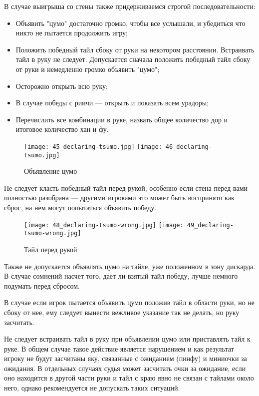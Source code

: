 В случае выигрыша со стены также придерживаемся строгой последовательности:

\begin{itemize}
	\item Объявить "цумо" достаточно громко, чтобы все услышали, и убедиться что никто не пытается продолжить игру;
	\item Положить победный тайл сбоку от руки на некотором расстоянии. Встраивать тайл в руку не следует. Допускается сначала положить победный тайл сбоку от руки и немедленно громко объявить "цумо";
	\item Осторожно открыть всю руку;
	\item В случае победы с риичи --- открыть и показать всем урадоры;
	\item Перечислить все комбинации в руке, назвать общее количество дор и итоговое количество хан и фу.
\end{itemize}

\begin{figure}[H]
	\centering
	\texttt{[image: 45\_declaring-tsumo.jpg]}
	\texttt{[image: 46\_declaring-tsumo.jpg]}
	\caption{Объявление цумо}
\end{figure}

Не следует класть победный тайл перед рукой, особенно если стена перед вами полностью разобрана --- другими игроками это может быть воспринято как сброс, на нем могут попытаться объявить победу.

\begin{figure}[H]
	\centering
	\texttt{[image: 48\_declaring-tsumo-wrong.jpg]}
	\texttt{[image: 49\_declaring-tsumo-wrong.jpg]}
	\caption{Тайл перед рукой}
\end{figure}

Также не допускается объявлять цумо на тайле, уже положенном в зону дискарда. В случае сомнений насчет того, дает ли взятый тайл победу, лучше немного подумать перед сбросом.

В случае если игрок пытается объявить цумо положив тайл в области руки, но не сбоку от нее, ему следует вынести вежливое указание так не делать, но руку засчитать. 

\newpage

Не следует встраивать тайл в руку при объявлении цумо или приставлять тайл к руке. В общем случае такое действие является нарушением и как результат игроку не будут засчитаны яку, связанные с ожиданием (пинфу) и миниочки за ожидания. В отдельных случаях судья может засчитать очки за ожидание, если оно находится в другой части руки и тайл с краю явно не связан с тайлами около него, однако рекомендуется не допускать таких ситуаций.

